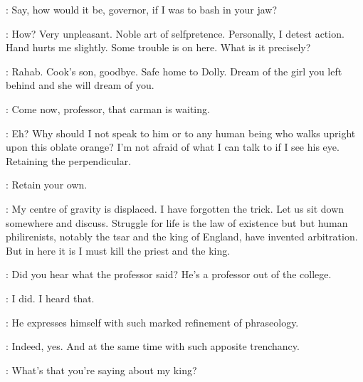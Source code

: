 \Carr:
Say, how would it be, governor, if I was to bash in your jaw?

\Stephen:
How?
Very unpleasant.
Noble art of selfpretence.
Personally, I detest action.
Hand hurts me slightly.
Some trouble is on here.
What is it precisely?

\DollyGray:
Rahab.
Cook's son, goodbye.
Safe home to Dolly.
Dream of the girl you left behind
and she will dream of you.


\Bloom:
Come now, professor, that carman is waiting.

\Stephen:
Eh?
Why should I not speak to him or to any human being
who walks upright upon this oblate orange?
I'm not afraid of what I can talk to if I see his eye.
Retaining the perpendicular.

\Bloom:
Retain your own.

\Stephen:
My centre of gravity is displaced.
I have forgotten the trick.
Let us sit down somewhere and discuss.
Struggle for life is the law of existence but but human philirenists,
notably the tsar and the king of England, have invented arbitration.
But in here it is I must kill the priest and the king.

\BiddyClap:
Did you hear what the professor said?
He's a professor out of the college.

\CuntyKate:
I did.
I heard that.

\BiddyClap:
He expresses himself with such marked refinement of phraseology.

\CuntyKate:
Indeed, yes.
And at the same time with such apposite trenchancy.

\Carr:
What's that you're saying about my king?


